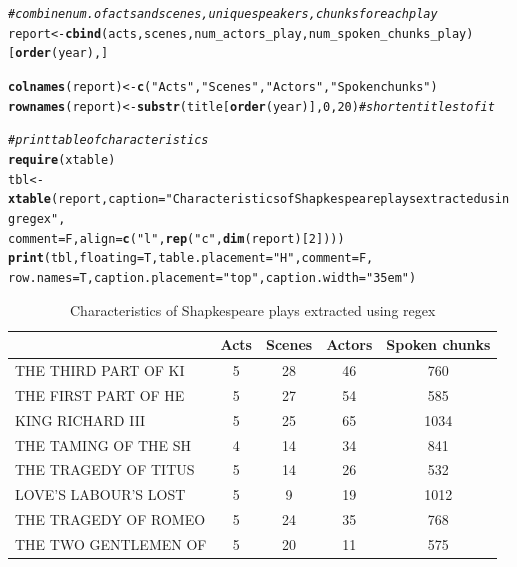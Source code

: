 \documentclass{article}\usepackage[]{graphicx}\usepackage[]{color}
\makeatletter
\newcommand{\hlnum}[1]{\textcolor[rgb]{0.686,0.059,0.569}{#1}}%
\newcommand{\hlstr}[1]{\textcolor[rgb]{0.192,0.494,0.8}{#1}}%
\newcommand{\hlcom}[1]{\textcolor[rgb]{0.678,0.584,0.686}{\textit{#1}}}%
\newcommand{\hlstd}[1]{\textcolor[rgb]{0.345,0.345,0.345}{#1}}%
\newcommand{\hlkwb}[1]{\textcolor[rgb]{0.69,0.353,0.396}{#1}}%
\newcommand{\hlkwc}[1]{\textcolor[rgb]{0.333,0.667,0.333}{#1}}%
\newcommand{\hlkwd}[1]{\textcolor[rgb]{0.737,0.353,0.396}{\textbf{#1}}}%
\newenvironment{kframe}{%
 \def\at@end@of@kframe{}%
 \ifinner\ifhmode%
  \def\at@end@of@kframe{\end{minipage}}%
  \begin{minipage}{\columnwidth}%
 \fi\fi%
 \def\FrameCommand##1{\hskip\@totalleftmargin \hskip-\fboxsep
 \colorbox{shadecolor}{##1}\hskip-\fboxsep
     \hskip-\linewidth \hskip-\@totalleftmargin \hskip\columnwidth}%
 \MakeFramed {\advance\hsize-\width
   \@totalleftmargin\z@ \linewidth\hsize
   \@setminipage}}%
 {\par\unskip\endMakeFramed%
 \at@end@of@kframe}
\makeatother
\begin{document}
\begin{kframe}
\begin{alltt}
\hlcom{#combine num. of acts and scenes, unique speakers, chunks for each play}
\hlstd{report} \hlkwb{<-} \hlkwd{cbind}\hlstd{(acts, scenes, num_actors_play, num_spoken_chunks_play)[}\hlkwd{order}\hlstd{(year),]}

\hlkwd{colnames}\hlstd{(report)} \hlkwb{<-} \hlkwd{c}\hlstd{(}\hlstr{"Acts"}\hlstd{,} \hlstr{"Scenes"}\hlstd{,} \hlstr{"Actors"}\hlstd{,} \hlstr{"Spoken chunks"}\hlstd{)}
\hlkwd{rownames}\hlstd{(report)} \hlkwb{<-} \hlkwd{substr}\hlstd{(title[}\hlkwd{order}\hlstd{(year)],} \hlnum{0}\hlstd{,} \hlnum{20}\hlstd{)} \hlcom{#shorten titles to fit}

\hlcom{#print table of characteristics}
\hlkwd{require}\hlstd{(xtable)}
\hlstd{tbl} \hlkwb{<-} \hlkwd{xtable}\hlstd{(report,} \hlkwc{caption} \hlstd{=} \hlstr{"Characteristics of Shapkespeare plays extracted using regex"}\hlstd{,}
           \hlkwc{comment} \hlstd{= F,} \hlkwc{align} \hlstd{=} \hlkwd{c}\hlstd{(}\hlstr{"l"}\hlstd{,} \hlkwd{rep}\hlstd{(}\hlstr{"c"}\hlstd{,} \hlkwd{dim}\hlstd{(report)[}\hlnum{2}\hlstd{])))}
\hlkwd{print}\hlstd{(tbl,} \hlkwc{floating} \hlstd{= T,} \hlkwc{table.placement} \hlstd{=} \hlstr{"H"}\hlstd{,} \hlkwc{comment} \hlstd{= F,}
      \hlkwc{row.names} \hlstd{= T,} \hlkwc{caption.placement} \hlstd{=} \hlstr{"top"}\hlstd{,} \hlkwc{caption.width} \hlstd{=} \hlstr{"35em"}\hlstd{)}
\end{alltt}
\end{kframe}\begin{table}[H]
\centering
\parbox{35em}{\caption{Characteristics of Shapkespeare plays extracted using regex}} 
\begin{tabular}{lcccc}
  \hline
 & Acts & Scenes & Actors & Spoken chunks \\ 
  \hline
THE THIRD PART OF KI &   5 &  28 &  46 & 760 \\ 
  THE FIRST PART OF HE &   5 &  27 &  54 & 585 \\ 
  KING RICHARD III &   5 &  25 &  65 & 1034 \\ 
  THE TAMING OF THE SH &   4 &  14 &  34 & 841 \\ 
  THE TRAGEDY OF TITUS &   5 &  14 &  26 & 532 \\ 
  LOVE'S LABOUR'S LOST &   5 &   9 &  19 & 1012 \\ 
  THE TRAGEDY OF ROMEO &   5 &  24 &  35 & 768 \\ 
  THE TWO GENTLEMEN OF &   5 &  20 &  11 & 575 \\ 

\end{tabular}
\end{table}
\end{document}
